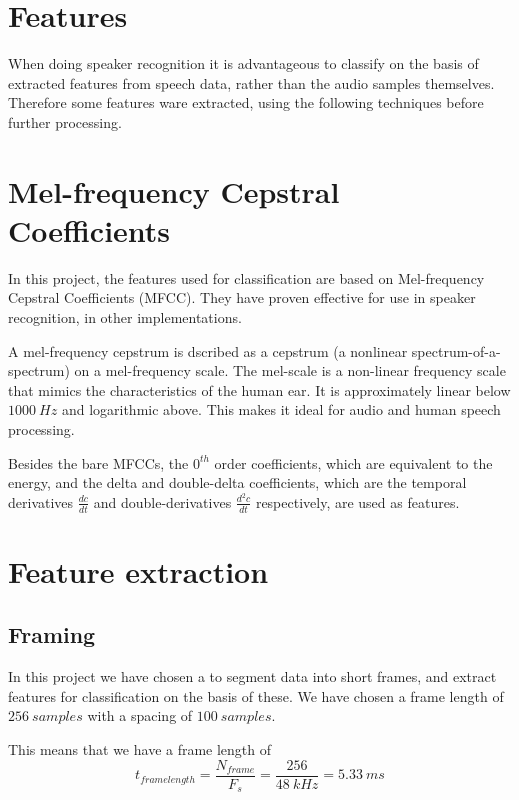 \section{Features}

When doing speaker recognition it is advantageous to classify on the basis of extracted features from speech data, rather than the audio samples themselves. %
Therefore some features ware extracted, using the following techniques before further processing.

\section{Mel-frequency Cepstral Coefficients}
In this project, the features used for classification are based on Mel-frequency Cepstral Coefficients (MFCC).
They have proven effective for use in speaker recognition, in other implementations. %

A mel-frequency cepstrum is dscribed as a cepstrum (a nonlinear spectrum-of-a-spectrum) on a mel-frequency scale.
The mel-scale is a non-linear frequency scale that mimics the characteristics of the human ear.
It is approximately linear below $ 1000\ Hz $ and logarithmic above.
This makes it ideal for audio and human speech processing.

Besides the bare MFCCs, the $ 0^{th} $ order coefficients, which are equivalent to the energy, and the delta and double-delta coefficients, which are the temporal derivatives $ \frac{dc}{dt} $ and double-derivatives $\frac{d^2c}{dt}$ respectively, are used as features.


\section{Feature extraction}
\subsection{Framing}
In this project we have chosen a to segment data into short frames, and extract features for classification on the basis of these.
We have chosen a frame length of $ 256\ samples $ with a spacing of $ 100\ samples $.

This means that we have a frame length of
\begin{equation}
t_{frame length} = \dfrac{N_{frame}}{F_s} = \dfrac{256}{48\ kHz} = 5.33\ ms
\end{equation}

